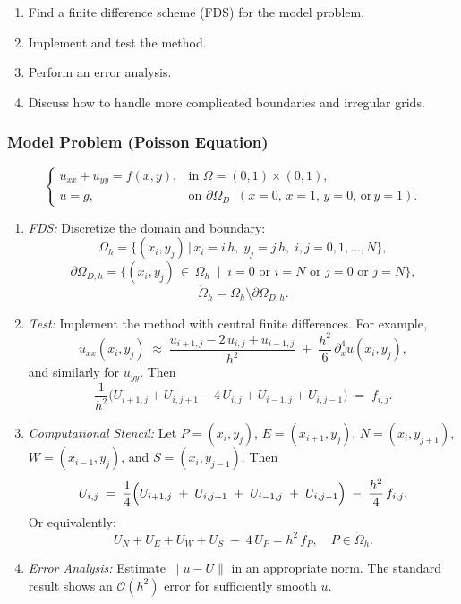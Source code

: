 \begin{enumerate}
  \item Find a finite difference scheme (FDS) for the model problem.
  \item Implement and test the method.
  \item Perform an error analysis.
  \item Discuss how to handle more complicated boundaries and irregular grids.
\end{enumerate}

\subsubsection{Model Problem (Poisson Equation)}
\[
  \begin{cases}
    u_{xx} + u_{yy} = f(x,y), & \text{in } \Omega = (0,1) \times (0,1),                               \\[6pt]
    u = g,                    & \text{on } \partial \Omega_D \;\; (x=0,\,x=1,\,y=0,\,\text{or}\,y=1).
  \end{cases}
\]

\begin{enumerate}
  \item \emph{FDS:} Discretize the domain and boundary:
        \[
          \Omega_h = \{(x_i,y_j)\,|\,x_i = i\,h,\;y_j = j\,h,\;i,j=0,1,\ldots,N\},
        \]
        \[
          \partial\Omega_{D,h} = \{(x_i,y_j)\,\in\,\Omega_h \;\mid\; i=0\text{ or }i=N\text{ or }j=0\text{ or }j=N\},
        \]
        \[
          \mathring{\Omega}_h = \Omega_h \setminus \partial\Omega_{D,h}.
        \]

  \item \emph{Test:} Implement the method with central finite differences. For example,
        \[
          u_{xx}(x_i,y_j) \;\approx\; \frac{u_{i+1,j} - 2\,u_{i,j} + u_{i-1,j}}{h^2}
          \;+\;\frac{h^2}{6}\,\partial_x^4u(x_i,y_j),
        \]
        and similarly for \(u_{yy}\). Then
        \[
          \frac{1}{h^2}\bigl(U_{i+1,j} + U_{i,j+1} - 4\,U_{i,j} + U_{i-1,j} + U_{i,j-1}\bigr)
          \;=\; f_{i,j}.
        \]

  \item \emph{Computational Stencil:}
        Let \(P=(x_i,y_j)\), \(E=(x_{i+1},y_j)\), \(N=(x_i,y_{j+1})\), \(W=(x_{i-1},y_j)\), and \(S=(x_i,y_{j-1})\). Then
        \[
          U_{i,j}
          \;=\;
          \frac{1}{4}\Bigl(U_{i+1,j} \;+\; U_{i,j+1} \;+\; U_{i-1,j} \;+\; U_{i,j-1}\Bigr)
          \;-\;
          \frac{h^2}{4}\,f_{i,j}.
        \]
        Or equivalently:
        \[
          U_N + U_E + U_W + U_S \;-\;4\,U_P = h^2\,f_P,
          \quad P \in \mathring{\Omega}_h.
        \]

  \item \emph{Error Analysis:} Estimate \(\|u - U\|\) in an appropriate norm. The standard result shows an \(\mathcal{O}(h^2)\) error for sufficiently smooth \(u\).
\end{enumerate}

